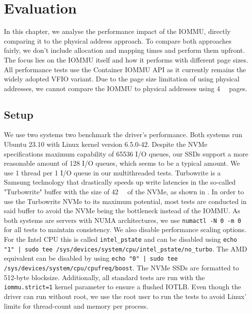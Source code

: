 \chapter{Evaluation}
In this chapter, we analyse the performance impact of the IOMMU, directly comparing it to the physical address approach. To compare both approaches fairly, we don't include allocation and mapping times and perform them upfront. The focus lies on the IOMMU itself and how it performs with different page sizes. All performance tests use the Container IOMMU API as it currently remains the widely adopted VFIO variant.
Due to the page size limitation of using physical addresses, we cannot compare the IOMMU to physical addresses using \qty{4}{\kibi\byte} pages.

\section{Setup}
We use two systems two benchmark the driver's performance.
Both systems run Ubuntu 23.10 with Linux kernel version 6.5.0-42.
Despite the NVMe specifications maximum capability of 65536 I/O queues, our SSDs support a more reasonable amount of 128 I/O queues, which seems to be a typical amount.
We use 1 thread per 1 I/O queue in our multithreaded tests. Turbowrite is a Samsung technology that drastically speeds up write latencies in the so-called "Turbowrite" buffer with the size of \qty{42}{\giga\byte} of the NVMe, as shown in \cite{vroom}. In order to use the Turbowrite NVMe to its maximum potential, most tests are conducted in said buffer to avoid the NVMe being the bottleneck instead of the IOMMU.
As both systems are servers with NUMA architectures, we use \texttt{numactl -N 0 -m 0} for all tests to maintain consistency. We also disable performance scaling options. For the Intel CPU this is called \texttt{intel\_pstate} and can be disabled using \texttt{echo "1" | sudo tee /sys/devices/system/cpu/intel\_pstate/no\_turbo}. The AMD equivalent can be disabled by using \texttt{echo "0" | sudo tee /sys/devices/system/cpu/cpufreq/boost}.
The NVMe SSDs are formatted to 512-byte blocksize.
Additionally, all standard tests are run with the \texttt{iommu.strict=1} kernel parameter to ensure a flushed IOTLB. Even though the driver can run without root, we use the root user to run the tests to avoid Linux' limits for thread-count and memory per process.

